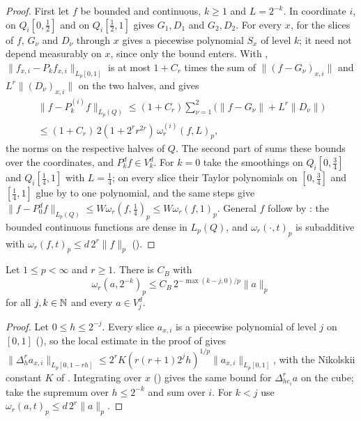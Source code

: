 \begin{proof}
\leanok
First let $f$ be bounded and continuous, $k \geq 1$ and $L = 2^{-k}$. In coordinate $i$,
 on $Q_i[0, \tfrac12]$ and on $Q_i[\tfrac12, 1]$ gives
$G_1, D_1$ and $G_2, D_2$. For every $x$,  for the slices of $f$, $G_\nu$ and
$D_\nu$ through $x$ gives a piecewise polynomial $S_x$ of level $k$; it need not depend
measurably on $x$, since only the bound enters. With ,
$\|f_{x,i} - P_k f_{x,i}\|_{L_p[0,1]}$ is at most $1 + C_r$ times the sum of
$\|(f - G_\nu)_{x,i}\|$ and $L^r \|(D_\nu)_{x,i}\|$ on the two halves, and
 gives
\begin{multline*}
  \|f - P_k^{(i)} f\|_{L_p(Q)}
  \leq (1 + C_r) \sum_{\nu = 1}^2 \bigl( \|f - G_\nu\| + L^r \|D_\nu\| \bigr) \\
  \leq (1 + C_r) \, 2 (1 + 2^r r^{2r}) \, \omega_r^{(i)}(f, L)_p ,
\end{multline*}
the norms on the respective halves of $Q$. The second part of  sums
these bounds over the coordinates, and $P^d_k f \in V^d_k$. For $k = 0$ take the smoothings on
$Q_i[0, \tfrac34]$ and $Q_i[\tfrac14, 1]$ with $L = \tfrac14$; on every slice their Taylor
polynomials on $[0, \tfrac34]$ and $[\tfrac14, 1]$ glue by  to one
polynomial, and the same steps give $\|f - P_0^d f\|_{L_p(Q)} \leq W \omega_r(f, \tfrac14)_p
\leq W \omega_r(f, 1)_p$. General $f$ follow by : the bounded continuous
functions are dense in $L_p(Q)$, and $\omega_r(\cdot, t)_p$ is subadditive with
$\omega_r(f, t)_p \leq d \, 2^r \|f\|_p$ ().
\end{proof}

\begin{theorem}
\label{thm:cube-inverse}
\leanok
{}
Let $1 \leq p < \infty$ and $r \geq 1$. There is $C_B$ with
\[
  \omega_r(a, 2^{-k})_p \leq C_B \, 2^{-\max(k - j, 0)/p} \|a\|_p
\]
for all $j, k \in \mathbb{N}$ and every $a \in V^d_j$.
\end{theorem}

\begin{proof}
\leanok
Let $0 \leq h \leq 2^{-j}$. Every slice $a_{x,i}$ is a piecewise polynomial of level $j$ on
$[0, 1]$ (), so the local estimate in the proof of  gives
$\|\Delta_h^r a_{x,i}\|_{L_p[0, 1 - rh]} \leq 2^r K (r (r + 1) 2^j h)^{1/p} \|a_{x,i}\|_{L_p[0,1]}$,
with the Nikolskii constant $K$ of . Integrating over $x$
() gives the same bound for $\Delta^r_{h e_i} a$ on the cube; take the
supremum over $h \leq 2^{-k}$ and sum over $i$. For $k < j$ use
$\omega_r(a, t)_p \leq d \, 2^r \|a\|_p$.
\end{proof}

